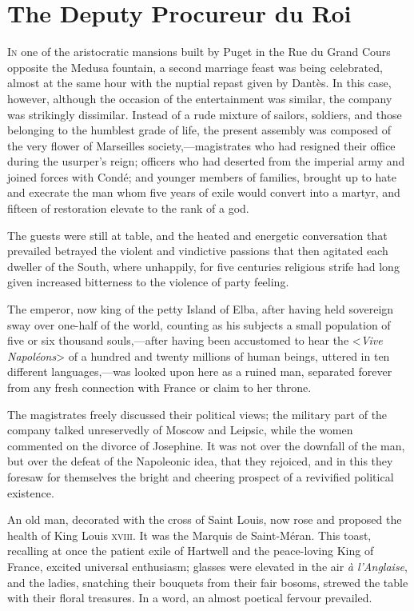 \chapter{The Deputy Procureur du Roi} 

 \lettrine{I}{n} one of the aristocratic mansions built by Puget in the Rue du Grand Cours opposite the Medusa fountain, a second marriage feast was being celebrated, almost at the same hour with the nuptial repast given by Dantès. In this case, however, although the occasion of the entertainment was similar, the company was strikingly dissimilar. Instead of a rude mixture of sailors, soldiers, and those belonging to the humblest grade of life, the present assembly was composed of the very flower of Marseilles society,—magistrates who had resigned their office during the usurper's reign; officers who had deserted from the imperial army and joined forces with Condé; and younger members of families, brought up to hate and execrate the man whom five years of exile would convert into a martyr, and fifteen of restoration elevate to the rank of a god. 

 The guests were still at table, and the heated and energetic conversation that prevailed betrayed the violent and vindictive passions that then agitated each dweller of the South, where unhappily, for five centuries religious strife had long given increased bitterness to the violence of party feeling. 

 The emperor, now king of the petty Island of Elba, after having held sovereign sway over one-half of the world, counting as his subjects a small population of five or six thousand souls,—after having been accustomed to hear the <\textit{Vive Napoléons}> of a hundred and twenty millions of human beings, uttered in ten different languages,—was looked upon here as a ruined man, separated forever from any fresh connection with France or claim to her throne. 

 The magistrates freely discussed their political views; the military part of the company talked unreservedly of Moscow and Leipsic, while the women commented on the divorce of Josephine. It was not over the downfall of the man, but over the defeat of the Napoleonic idea, that they rejoiced, and in this they foresaw for themselves the bright and cheering prospect of a revivified political existence. 

 An old man, decorated with the cross of Saint Louis, now rose and proposed the health of King Louis \textsc{xviii.} It was the Marquis de Saint-Méran. This toast, recalling at once the patient exile of Hartwell and the peace-loving King of France, excited universal enthusiasm; glasses were elevated in the air \textit{à l'Anglaise}, and the ladies, snatching their bouquets from their fair bosoms, strewed the table with their floral treasures. In a word, an almost poetical fervour prevailed. 

